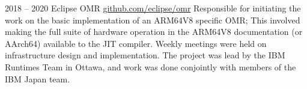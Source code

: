 \ifdefined{}
\fi




\vspace*{6pt}

\entrys
{2018 -- 2020}
{Eclipse OMR}
{\href{https://github.com/eclipse/omr}{github.com/eclipse/omr}}{
	Responsible for initiating the work on the basic implementation of an ARM64V8 specific OMR; This involved making the full suite of hardware operation in the ARM64V8 documentation (or AArch64) available to the JIT compiler.
	Weekly meetings were held on infrastructure design and implementation.
	The project was lead by the IBM Runtimes Team in Ottawa, and work was done conjointly with members of the IBM Japan team.
}

